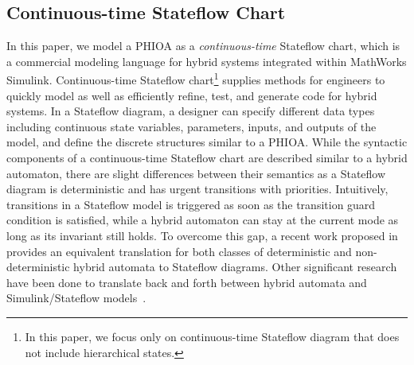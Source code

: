 \subsection{Continuous-time Stateflow Chart}
In this paper, we model a PHIOA as a \emph{continuous-time} Stateflow chart, which is a commercial modeling language for hybrid systems integrated within MathWorks Simulink.
%
Continuous-time Stateflow chart\footnote{In this paper, we focus only on continuous-time Stateflow diagram that does not include hierarchical states.} supplies methods for engineers to quickly model as well as efficiently refine, test, and generate code for hybrid systems. In a Stateflow diagram, a designer can specify different data types including continuous state variables, parameters, inputs, and outputs of the model, and define the discrete structures similar to a PHIOA.
%
While the syntactic components of a continuous-time Stateflow chart are described similar to a hybrid automaton, there are slight differences between their semantics as a Stateflow diagram is deterministic and has urgent transitions with priorities. Intuitively, transitions in a Stateflow model is triggered as soon as the transition guard condition is satisfied, while a hybrid automaton can stay at the current mode as long as its invariant still holds. To overcome this gap, a recent work proposed in~\cite{bak2017hybrid} provides an equivalent translation for both classes of deterministic and non-deterministic hybrid automata to Stateflow diagrams. Other significant research have been done to translate back and forth between hybrid automata and Simulink/Stateflow models~\cite{alur2008symbolic,manamcheri2011step,minopoli2016sl2sx}.
%

